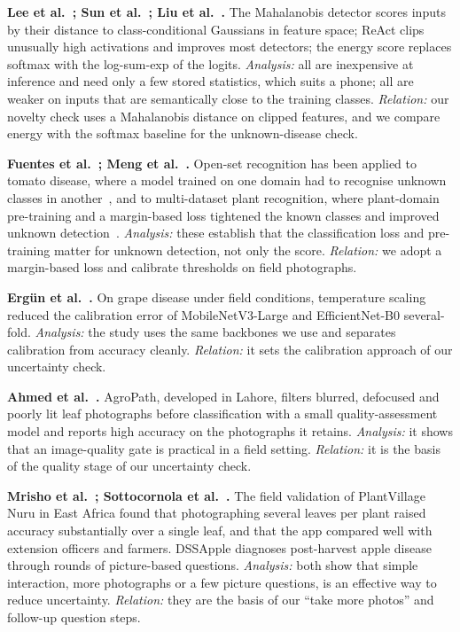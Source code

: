 \textbf{Lee et al.~\cite{lee2018mahalanobis}; Sun et al.~\cite{sun2021react}; Liu et al.~\cite{liu2020energy}.} The Mahalanobis detector scores inputs by their distance to class-conditional Gaussians in feature space; ReAct clips unusually high activations and improves most detectors; the energy score replaces softmax with the log-sum-exp of the logits. \emph{Analysis:} all are inexpensive at inference and need only a few stored statistics, which suits a phone; all are weaker on inputs that are semantically close to the training classes. \emph{Relation:} our novelty check uses a Mahalanobis distance on clipped features, and we compare energy with the softmax baseline for the unknown-disease check.

\textbf{Fuentes et al.~\cite{fuentes2021openset}; Meng et al.~\cite{meng2023osr}.} Open-set recognition has been applied to tomato disease, where a model trained on one domain had to recognise unknown classes in another~\cite{fuentes2021openset}, and to multi-dataset plant recognition, where plant-domain pre-training and a margin-based loss tightened the known classes and improved unknown detection~\cite{meng2023osr}. \emph{Analysis:} these establish that the classification loss and pre-training matter for unknown detection, not only the score. \emph{Relation:} we adopt a margin-based loss and calibrate thresholds on field photographs.

\textbf{Erg\"un et al.~\cite{ergun2026grape}.} On grape disease under field conditions, temperature scaling reduced the calibration error of MobileNetV3-Large and EfficientNet-B0 several-fold. \emph{Analysis:} the study uses the same backbones we use and separates calibration from accuracy cleanly. \emph{Relation:} it sets the calibration approach of our uncertainty check.

\textbf{Ahmed et al.~\cite{ahmed2022agropath}.} AgroPath, developed in Lahore, filters blurred, defocused and poorly lit leaf photographs before classification with a small quality-assessment model and reports high accuracy on the photographs it retains. \emph{Analysis:} it shows that an image-quality gate is practical in a field setting. \emph{Relation:} it is the basis of the quality stage of our uncertainty check.

\textbf{Mrisho et al.~\cite{mrisho2020nuru}; Sottocornola et al.~\cite{sottocornola2022dssapple}.} The field validation of PlantVillage Nuru in East Africa found that photographing several leaves per plant raised accuracy substantially over a single leaf, and that the app compared well with extension officers and farmers. DSSApple diagnoses post-harvest apple disease through rounds of picture-based questions. \emph{Analysis:} both show that simple interaction, more photographs or a few picture questions, is an effective way to reduce uncertainty. \emph{Relation:} they are the basis of our ``take more photos'' and follow-up question steps.

